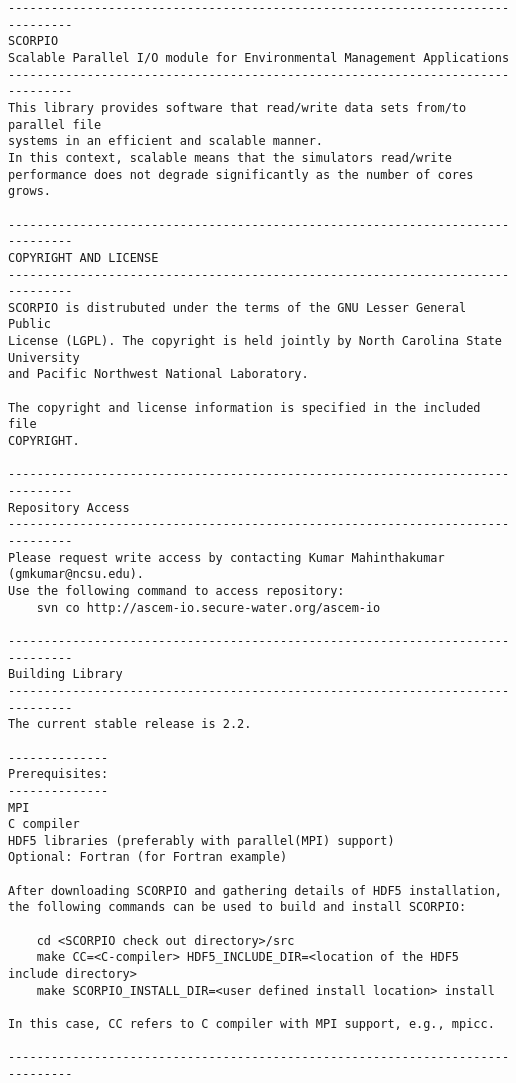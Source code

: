 \scriptsize
\begin{verbatim}
-------------------------------------------------------------------------------
SCORPIO
Scalable Parallel I/O module for Environmental Management Applications
-------------------------------------------------------------------------------
This library provides software that read/write data sets from/to parallel file 
systems in an efficient and scalable manner. 
In this context, scalable means that the simulators read/write 
performance does not degrade significantly as the number of cores grows.

-------------------------------------------------------------------------------
COPYRIGHT AND LICENSE 
-------------------------------------------------------------------------------
SCORPIO is distrubuted under the terms of the GNU Lesser General Public 
License (LGPL). The copyright is held jointly by North Carolina State University 
and Pacific Northwest National Laboratory. 

The copyright and license information is specified in the included file 
COPYRIGHT. 

-------------------------------------------------------------------------------
Repository Access
-------------------------------------------------------------------------------
Please request write access by contacting Kumar Mahinthakumar (gmkumar@ncsu.edu). 
Use the following command to access repository:
	svn co http://ascem-io.secure-water.org/ascem-io

-------------------------------------------------------------------------------
Building Library
-------------------------------------------------------------------------------
The current stable release is 2.2.

--------------
Prerequisites:
--------------
MPI
C compiler
HDF5 libraries (preferably with parallel(MPI) support)
Optional: Fortran (for Fortran example)

After downloading SCORPIO and gathering details of HDF5 installation, 
the following commands can be used to build and install SCORPIO: 

	cd <SCORPIO check out directory>/src
	make CC=<C-compiler> HDF5_INCLUDE_DIR=<location of the HDF5 include directory>
	make SCORPIO_INSTALL_DIR=<user defined install location> install

In this case, CC refers to C compiler with MPI support, e.g., mpicc.

-------------------------------------------------------------------------------
\end{verbatim}

